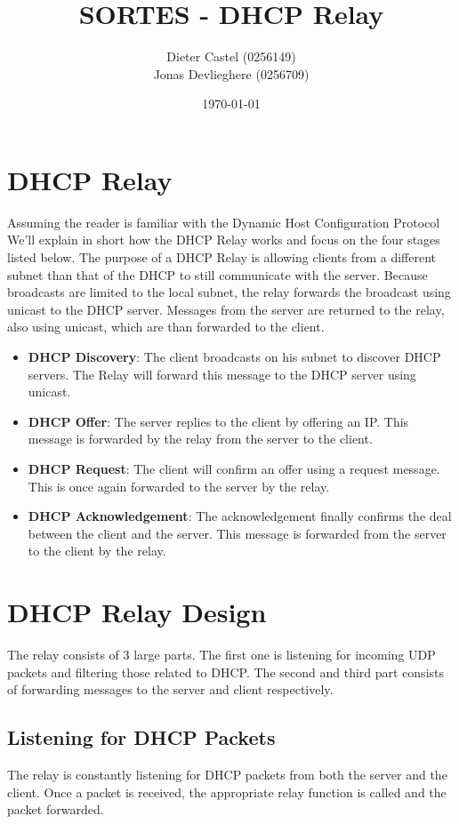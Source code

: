 \documentclass[11pt]{article}
\title{SORTES - DHCP Relay}
\author{Dieter Castel (0256149) \\ Jonas Devlieghere (0256709)}
\date{\today}
\begin{document}
\maketitle
\newpage

\tableofcontents
\newpage

\section{DHCP Relay}
Assuming the reader is familiar with the Dynamic Host Configuration Protocol
We'll explain in short how the DHCP Relay works and focus on the four stages
listed below. The purpose of a DHCP Relay is allowing clients from a different
subnet than that of the DHCP to still communicate with the server. Because
broadcasts are limited to the local subnet, the relay forwards the broadcast
using unicast to the DHCP server. Messages from the server are returned to the
relay, also using unicast, which are than forwarded to the client.

\begin{itemize}
	\item \textbf{DHCP Discovery}: The client broadcasts on his subnet to
	discover DHCP servers. The Relay will forward this message to the DHCP
	server using unicast.
	\item \textbf{DHCP Offer}: The server replies to the client by offering an
	IP. This message is forwarded by the relay from the server to the client.
	\item \textbf{DHCP Request}: The client will confirm an offer using a
	request message. This is once again forwarded to the server by the relay.
	\item \textbf{DHCP Acknowledgement}: The acknowledgement finally confirms
	the deal between the client and the server. This message is forwarded from
	the server to the client by the relay.
\end{itemize}

\section{DHCP Relay Design}
The relay consists of 3 large parts. The first one is listening for incoming UDP
packets and filtering those related to DHCP. The second and third part consists
of forwarding messages to the server and client respectively.

\subsection{Listening for DHCP Packets}
The relay is constantly listening for DHCP packets from both the server and the
client. Once a packet is received, the appropriate relay function is called and
the packet forwarded.
\end{document}
